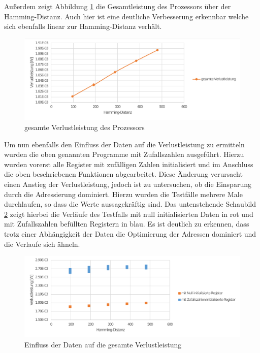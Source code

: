 Außerdem zeigt Abbildung \ref{fig:total_power_source_target} die Gesamtleistung des Prozessors über der Hamming-Distanz. Auch hier ist eine deutliche Verbesserung erkennbar welche sich ebenfalls linear zur Hamming-Distanz verhält.

\begin{figure}[H]
	\centering
	\includegraphics[width=\textwidth]{fig/total_power_source_target.pdf}
	\caption{gesamte Verlustleistung des Prozessors}
	\label{fig:total_power_source_target}
\end{figure}

Um nun ebenfalls den Einfluss der Daten auf die Verlustleistung zu ermitteln wurden die oben genannten Programme mit Zufallszahlen ausgeführt. Hierzu wurden vorerst alle Register mit zufälligen Zahlen initialisiert und im Anschluss die oben beschriebenen Funktionen abgearbeitet. Diese Änderung verursacht einen Anstieg der Verlustleistung, jedoch ist zu untersuchen, ob die Einsparung durch die Adressierung dominiert. Hierzu wurden die Testfälle mehrere Male durchlaufen, so dass die Werte aussagekräftig sind. Das untenstehende Schaubild \ref{fig:random_data_total_power} zeigt hierbei die Verläufe des Testfalls mit null initialisierten Daten in rot und mit Zufallszahlen befüllten Registern in blau. Es ist deutlich zu erkennen, dass trotz einer Abhängigkeit der Daten die Optimierung der Adressen dominiert und die Verlaufe sich ähneln.

\begin{figure}[H]
	\centering
	\includegraphics[width=\textwidth]{fig/random_data_total_power.pdf}
	\caption{Einfluss der Daten auf die gesamte Verlustleistung}
	\label{fig:random_data_total_power}
\end{figure}


